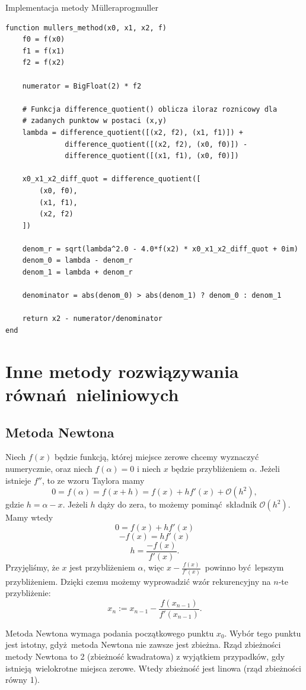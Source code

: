\documentclass[12pt]{article}
\begin{document}
\begin{prog}{Implementacja metody Müllera}{progmuller}
\begin{lstlisting}
function mullers_method(x0, x1, x2, f)
    f0 = f(x0)
    f1 = f(x1)
    f2 = f(x2)

    numerator = BigFloat(2) * f2

    # Funkcja difference_quotient() oblicza iloraz roznicowy dla
    # zadanych punktow w postaci (x,y)
    lambda = difference_quotient([(x2, f2), (x1, f1)]) +
              difference_quotient([(x2, f2), (x0, f0)]) -
              difference_quotient([(x1, f1), (x0, f0)])
    
    x0_x1_x2_diff_quot = difference_quotient([
        (x0, f0), 
        (x1, f1), 
        (x2, f2)
    ])
    
    denom_r = sqrt(lambda^2.0 - 4.0*f(x2) * x0_x1_x2_diff_quot + 0im)
    denom_0 = lambda - denom_r
    denom_1 = lambda + denom_r

    denominator = abs(denom_0) > abs(denom_1) ? denom_0 : denom_1

    return x2 - numerator/denominator
end
\end{lstlisting}
\end{prog}

\section{Inne metody rozwiązywania równań nieliniowych}

\subsection{Metoda Newtona \cite{kincaid}}

Niech $f(x)$ będzie funkcją, której miejsce zerowe chcemy wyznaczyć numerycznie,
oraz niech $f(\alpha)=0$ i niech $x$ będzie przybliżeniem $\alpha$. Jeżeli
istnieje $f''$, to ze wzoru Taylora mamy
\[0 = f(\alpha) = f(x+h) = f(x) + hf'(x) + \mathcal{O}(h^2),\]
gdzie $h = \alpha - x$. Jeżeli $h$ dąży do zera, to możemy pominąć składnik
$\mathcal{O}(h^2)$. Mamy wtedy
\[0 = f(x) + hf'(x)\]
\[-f(x) = hf'(x)\]
\[h = \frac{-f(x)}{f'(x)}.\]
Przyjęliśmy, że $x$ jest przybliżeniem $\alpha$, więc 
\large$x-\frac{f(x)}{f'(x)}$\normalsize\, powinno być lepszym przybliżeniem.
Dzięki czemu możemy wyprowadzić wzór rekurencyjny na $n$-te przybliżenie:
\[x_n := x_{n-1} - \frac{f(x_{n-1})}{f'(x_{n-1})}.\label{newtonformula}\tag{2}\]

Metoda Newtona wymaga podania początkowego punktu $x_0$. Wybór tego punktu jest
istotny, gdyż metoda Newtona nie zawsze jest zbieżna.
Rząd zbieżności metody Newtona to 2 (zbieżność kwadratowa) z wyjątkiem
przypadków, gdy istnieją wielokrotne miejsca zerowe. Wtedy zbieżność jest
linowa (rząd zbieżności równy 1).
\end{document}
